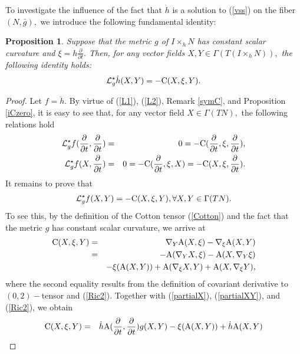 \documentclass[10pt,leqno,oneside]{amsart}
\newtheorem{Prop}{Proposition}
\begin{document}
{          To investigate the influence of the fact that $\dot{h}$ is a solution to (\ref{vss}) on the fiber $(N, \bar{g}),$ we introduce the following fundamental identity:

    \begin{Prop}\label{warpedproduct3}
          Suppose that the metric $g$ of $I\times_hN $ has constant scalar curvature and $\xi=h\frac{\partial}{\partial t}.$ Then, for any vector fields $X,Y\in\Gamma(T(I\times_hN)),$ the following identity holds:
        $$\mathcal{L}_g^{\star}\dot{h}(X,Y)=-{\rm{C}}(X,\xi,Y).$$
    \end{Prop}
    \begin{proof}
          Let $f=\dot{h}.$ By virtue of (\ref{L1}), (\ref{L2}), Remark \ref{symC}, and Proposition \ref{iCzero}, it is easy to see that, for any vector field $X\in\Gamma(TN ),$ the following relations hold
        \begin{eqnarray*}
           \mathcal{L}_g^{\star}f(\frac{\partial}{\partial t},\frac{\partial}{\partial t}) &=& 0=-{\rm{C}}(\frac{\partial}{\partial t},\xi,\frac{\partial}{\partial t}), \\
           \mathcal{L}_g^{\star}f(X,\frac{\partial}{\partial t}) &=& 0=-{\rm{C}}(\frac{\partial}{\partial t},\xi,X)=-{\rm{C}}(X,\xi,\frac{\partial}{\partial t}).
         \end{eqnarray*}
         It remains to prove that
         \begin{eqnarray}\label{LfCXY}
         \mathcal{L}_g^{\star}f(X,Y) =-{\rm{C}}(X,\xi,Y), \forall X,Y\in\Gamma(TN ).
         \end{eqnarray}
         To see this, by the definition of the Cotton tensor (\ref{Cotton}) and the fact that the metric $g$ has constant scalar curvature, we arrive at
         \begin{eqnarray*}
          {\rm{C}}(X,\xi,Y) &=&\nabla_{Y}{\rm{A}}(X,\xi)-\nabla_{\xi}{\rm{A}}(X,Y)\\
            &=&-{\rm{A}}(\nabla_{Y}X,\xi)-{\rm{A}}(X,\nabla_{Y}\xi)\\
            &&-\xi({\rm{A}}(X,Y))+{\rm{A}}(\nabla_{\xi}X,Y)+{\rm{A}}(X,\nabla_{\xi}Y),
         \end{eqnarray*}
         where the second equality results from the definition of covariant derivative to $(0,2)-$tensor and (\ref{Ric2}). Together with (\ref{partialX}), (\ref{partialXY}), and (\ref{Ric2}), we obtain
         \begin{eqnarray*}
          {\rm{C}}(X,\xi,Y) &=&\dot{h}{\rm{A}}(\frac{\partial}{\partial t},\frac{\partial}{\partial t})g(X,Y)-\xi({\rm{A}}(X,Y))+\dot{h}{\rm{A}}(X,Y)\\

\end{eqnarray*}
\end{proof}}
\end{document}
